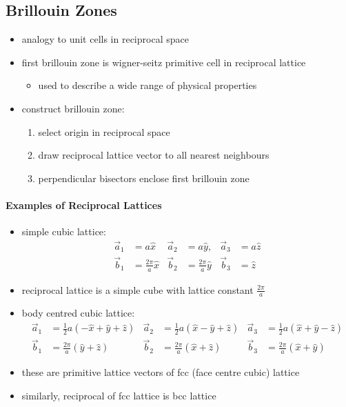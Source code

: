 \documentclass[a4paper,11pt,normalem]{article}
\begin{document}
\subsection{Brillouin Zones}

\begin{itemize}
    \item analogy to unit cells in reciprocal space
    \item first brillouin zone is wigner-seitz primitive cell in reciprocal lattice
        \begin{itemize}
            \item used to describe a wide range of physical properties
        \end{itemize}
    \item construct brillouin zone:
        \begin{enumerate}
            \item select origin in reciprocal space
            \item draw reciprocal lattice vector to all nearest neighbours
            \item perpendicular bisectors enclose first brillouin zone
        \end{enumerate}
\end{itemize}

\paragraph{Examples of Reciprocal Lattices}

\begin{itemize}
    \item simple cubic lattice:
        \begin{align*}
            \vec{a}_1 &= a\hat{x} & \vec{a}_2 &= a\hat{y}, & \vec{a}_3 &= a\hat{z} \\
            \vec{b}_{1} &= \frac{2\pi}{a} \hat{x} & \vec{b}_2 &= \frac{2\pi}{a}\hat{y} & \vec{b}_3 &= \hat{z}
        \end{align*}
    \item reciprocal lattice is a simple cube with lattice constant \(\frac{2\pi}{a}\)
    \item body centred cubic lattice:
        \begin{align*}
            \vec{a}_1 &= \frac{1}{2}a(-\hat{x} + \hat{y} + \hat{z}) & \vec{a}_2 &= \frac{1}{2}a(\hat{x}-\hat{y}+\hat{z}) & \vec{a}_3 &= \frac{1}{2}a(\hat{x}+\hat{y}-\hat{z}) \\
            \vec{b}_1 &= \frac{2\pi}{a}(\hat{y} + \hat{z}) & \vec{b}_2 &= \frac{2\pi}{a}(\hat{x}+\hat{z}) & \vec{b}_3 &= \frac{2\pi}{a}(\hat{x}+\hat{y})
        \end{align*}
    \item these are primitive lattice vectors of fcc (face centre cubic) lattice
    \item similarly, reciprocal of fcc lattice is bcc lattice
\end{itemize}
\end{document}
